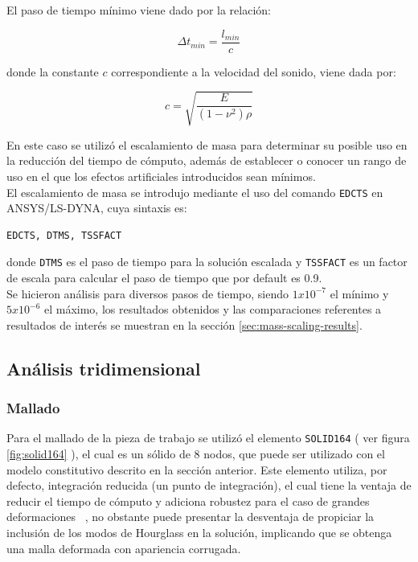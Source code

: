El paso de tiempo mínimo viene dado por la relación:

\begin{equation}
\Delta t_{min} = \frac{l_{min}}{c} 
\end{equation}

donde la constante $c$ correspondiente a la velocidad del sonido, viene dada por:

\begin{equation}
c = \sqrt{\frac{E}{(1-\nu^2)\rho}}
\end{equation}

En este caso se utilizó el escalamiento de masa para determinar su posible uso en la 
reducción del tiempo de cómputo, además de establecer o conocer un rango de uso en el que los 
efectos artificiales introducidos sean mínimos.\\

El escalamiento de masa se introdujo mediante el uso del comando \texttt{EDCTS} en ANSYS/LS-DYNA\CR,
cuya sintaxis es:

\begin{verbatim}
EDCTS, DTMS, TSSFACT
\end{verbatim}

donde \texttt{DTMS} es el paso de tiempo para la solución escalada y \texttt{TSSFACT} es un factor 
de escala para calcular el paso de tiempo que por default es 0.9.\\

Se hicieron análisis para diversos pasos de tiempo, siendo $1x10^{-7}$ el mínimo y $5x10^{-6}$ el 
máximo, los resultados obtenidos y las comparaciones referentes a resultados de interés se muestran 
en la sección \ref{sec:mass-scaling-results}.


\subsection{Análisis tridimensional}

\subsubsection{Mallado}

Para el mallado de la pieza de trabajo se utilizó el elemento \texttt{SOLID164} 
( ver figura \ref{fig:solid164} ), el cual es un sólido de 8 nodos, que puede ser utilizado con el modelo 
constitutivo descrito en la sección anterior. Este elemento utiliza, por defecto, integración reducida 
(un punto de integración), el cual tiene la ventaja de reducir el tiempo de cómputo y adiciona 
robustez para el caso de grandes deformaciones ~\cite{lsdyna-ansys-manual}, no obstante puede presentar 
la desventaja de propiciar la inclusión de los modos de Hourglass en la solución, implicando que 
se obtenga una malla deformada con apariencia corrugada.

